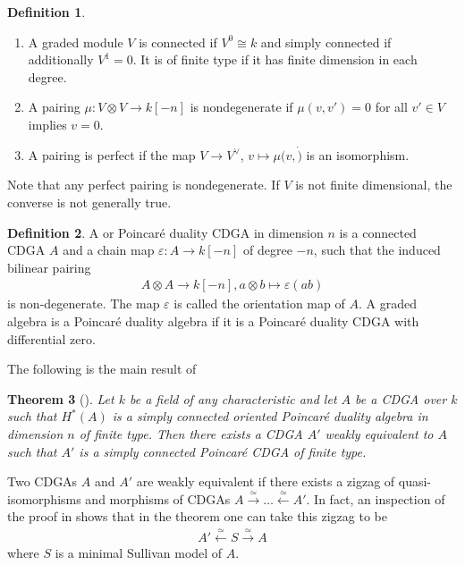 \documentclass{scrartcl}
\let\emph\relax
\theoremstyle{plain}
\newtheorem{theorem}{Theorem}[section]
\theoremstyle{definition}
\newtheorem{definition}[theorem]{Definition}
\renewcommand{\epsilon}{\varepsilon}
\newcommand{\iso}{\cong}
\newcommand{\quiso}{\simeq}
\let\xto\xrightarrow
\let\xfrom\xleftarrow
\begin{document}
\begin{definition}
    \begin{enumerate}
        \item A graded module $V$ is connected if $V^0 \iso k$ and simply connected if additionally $V^1 = 0$. It is of finite type if it has finite dimension in each degree.
        \item A pairing $\mu\colon V\otimes V\to k[-n]$ is nondegenerate if $\mu(v, v') = 0$ for all $v'\in V$ implies $v=0$.
        \item A pairing is perfect if the map $V\to V^\vee$, $v\mapsto \mu(v,\dot)$ is an isomorphism. 
    \end{enumerate}
\end{definition}

Note that any perfect pairing is nondegenerate. If $V$ is not finite dimensional, the converse is not generally true. 

\begin{definition}
    A \emph{Poincaré duality algebra} or Poincaré duality CDGA in dimension $n$ is a connected CDGA $A$ and a chain map $\epsilon\colon A\to k[-n]$ of degree $-n$, such that the induced bilinear pairing
    \begin{align*}
        A\otimes A\to k[-n], a\otimes b\mapsto \epsilon(ab)
    \end{align*}
    is non-degenerate. The map $\epsilon$ is called the orientation map of $A$. A graded algebra is a Poincaré duality algebra if it is a Poincaré duality CDGA with differential zero. 
\end{definition}

The following is the main result of 
\begin{theorem}[\cite{lambrechts2008poincare}]\label{thm:lambrechts-stanley-model}
    Let $k$ be a field of any characteristic and let $A$ be a CDGA over $k$ such that $H^*(A)$ is a simply connected oriented Poincaré duality algebra in dimension $n$ of finite type. Then there exists a CDGA $A'$ weakly equivalent to $A$ such that $A'$ is a simply connected Poincaré CDGA of finite type.
\end{theorem}
Two CDGAs $A$ and $A'$ are weakly equivalent if there exists a zigzag of quasi-isomorphisms and morphisms of CDGAs $A\xto{\quiso} \dots\xfrom{\quiso} A'$. In fact, an inspection of the proof in \cite{lambrechts2008poincare} shows that in the theorem one can take this zigzag to be
\begin{align*}
    A' \xfrom{\quiso} S\xto{\quiso} A
\end{align*}
where $S$ is a minimal Sullivan model of $A$. 
\end{document}
